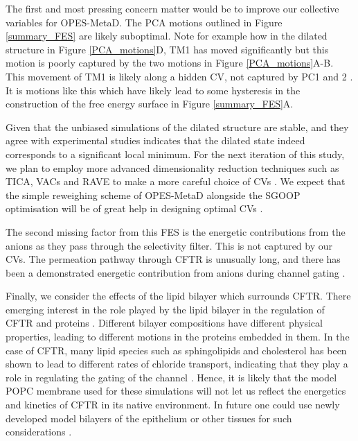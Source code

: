 The first and most pressing concern matter would be to improve our collective variables for OPES-MetaD. The PCA motions outlined in Figure \ref{summary_FES} are likely suboptimal. Note for example how in the dilated structure in Figure \ref{PCA_motions}D, TM1 has moved significantly but this motion is poorly captured by the two motions in Figure \ref{PCA_motions}A-B. This movement of TM1 is likely along a hidden CV, not captured by PC1 and 2 \cite{bussi2015, bussi2020a}. It is motions like this which have likely lead to some hysteresis in the construction of the free energy surface in Figure \ref{summary_FES}A. 

Given that the unbiased simulations of the dilated structure are stable, and they agree with experimental studies indicates that the dilated state indeed corresponds to a significant local minimum. For the next iteration of this study, we plan to employ more advanced dimensionality reduction techniques such as TICA, VACs and RAVE to make a more careful choice of CVs \cite{brotzakis2019, noe2001, schultze2021, brotzakis2019, ribeiro2018} . We expect that the simple reweighing scheme of OPES-MetaD alongside the SGOOP optimisation will be of great help in designing optimal CVs \cite{invernizzi2020, invernizzi2022, smith2018, tiwary2016b}. 

The second missing factor from this FES is the energetic contributions from the anions as they pass through the selectivity filter. This is not captured by our CVs. The permeation pathway through CFTR is unusually long, and there has been a demonstrated energetic contribution from anions during channel gating \cite{gong2004, gong2003, gong2003a, tabcharani1993, zhou2002, sorum2015, yeh2015}. 

Finally, we consider the effects of the lipid bilayer which surrounds CFTR. There emerging interest in the role played by the lipid bilayer in the regulation of CFTR and proteins \cite{cottrill2020, lin2022, kapoor2021}. Different bilayer compositions have different physical properties, leading to different motions in the proteins embedded in them. In the case of CFTR, many lipid species such as sphingolipids and cholesterol has been shown to lead to different rates of chloride transport, indicating that they play a role in regulating the gating of the channel \cite{aureli2016, farinha2018, cottrill2020}. Hence, it is likely that the model POPC membrane used for these simulations will not let us reflect the energetics and kinetics of CFTR in its native environment. In future one could use newly developed model bilayers of the epithelium or other tissues for such considerations \cite{wilson2021}.

